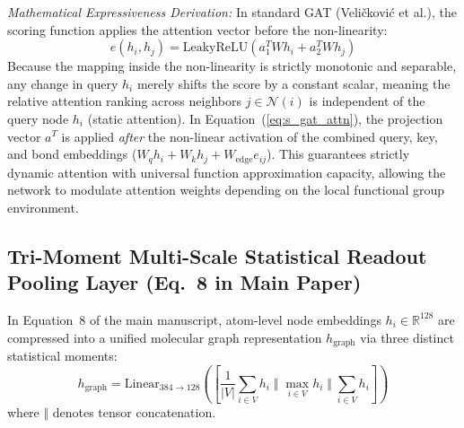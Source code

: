 \documentclass[11pt]{article}
\begin{document}
\noindent\textit{Mathematical Expressiveness Derivation:} In standard GAT (Veli\v{c}kovi\'c et al.), the scoring function applies the attention vector before the non-linearity:
\begin{equation}
e(h_i, h_j) = \mathrm{LeakyReLU}\left( a_1^T W h_i + a_2^T W h_j \right)
\end{equation}
Because the mapping inside the non-linearity is strictly monotonic and separable, any change in query $h_i$ merely shifts the score by a constant scalar, meaning the relative attention ranking across neighbors $j \in \mathcal{N}(i)$ is independent of the query node $h_i$ (static attention). In Equation~(\ref{eq:s_gat_attn}), the projection vector $a^T$ is applied \textit{after} the non-linear activation of the combined query, key, and bond embeddings ($W_q h_i + W_k h_j + W_{\mathrm{edge}} e_{ij}$). This guarantees strictly dynamic attention with universal function approximation capacity, allowing the network to modulate attention weights depending on the local functional group environment.

\subsection{Tri-Moment Multi-Scale Statistical Readout Pooling Layer (Eq.~8 in Main Paper)}
\label{sec:readout_derivation}

In Equation~8 of the main manuscript, atom-level node embeddings $h_i \in \mathbb{R}^{128}$ are compressed into a unified molecular graph representation $h_{\mathrm{graph}}$ via three distinct statistical moments:
\begin{equation}
h_{\mathrm{graph}} = \mathrm{Linear}_{384 \to 128} \left( \left[ \frac{1}{|V|}\sum_{i \in V} h_i \; \Big\Vert \; \max_{i \in V} h_i \; \Big\Vert \; \sum_{i \in V} h_i \right] \right)
\label{eq:s_readout}
\end{equation}
where $\Vert$ denotes tensor concatenation.
\end{document}
